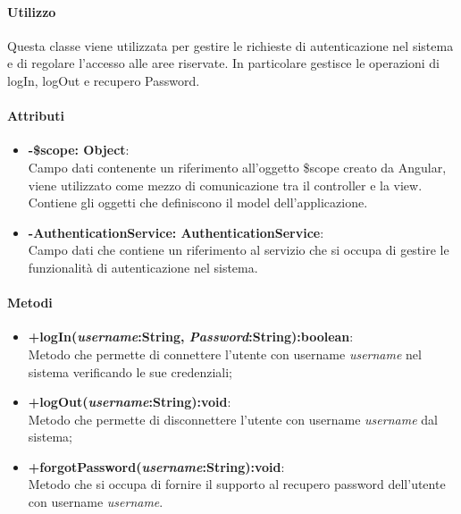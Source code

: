 	\paragraph{Utilizzo}
	Questa classe viene utilizzata per gestire le richieste di autenticazione nel sistema e di regolare l'accesso alle aree riservate.
	In particolare gestisce le operazioni di logIn, logOut e recupero Password.
	\paragraph{Attributi}
	\begin{itemize}
		\item \textbf{-\$scope: Object}:\\
			Campo dati contenente un riferimento all'oggetto \$scope creato da Angular, viene utilizzato come mezzo di comunicazione tra il controller e la view. Contiene gli oggetti che definiscono il model dell'applicazione.
		\item \textbf{-AuthenticationService: AuthenticationService}:\\
			Campo dati che contiene un riferimento al servizio che si occupa di gestire le funzionalità di autenticazione nel sistema.
	\end{itemize}
	
	\paragraph{Metodi}
	\begin{itemize}
	  \item \textbf{+logIn(\textit{username}:String, \textit{Password}:String):boolean}:\\
		 Metodo che permette di connettere l'utente con username \textit{username} nel sistema verificando le sue credenziali;
	  \item \textbf{+logOut(\textit{username}:String):void}:\\
		  Metodo che permette di disconnettere l'utente con username \textit{username} dal sistema;
	  \item \textbf{+forgotPassword(\textit{username}:String):void}:\\
		  Metodo che si occupa di fornire il supporto al recupero password dell'utente con username \textit{username}.
	\end{itemize}
